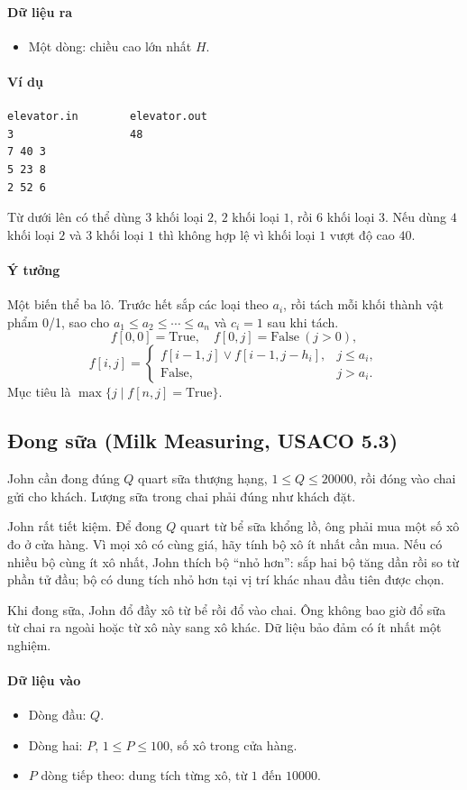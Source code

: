 \documentclass[11pt]{article}
\newcommand{\problem}[1]{\subsection{#1}}
\newcommand{\iosec}[1]{\paragraph{#1}}
\begin{document}
\iosec{Dữ liệu ra}
\begin{itemize}
  \item Một dòng: chiều cao lớn nhất \(H\).
\end{itemize}

\iosec{Ví dụ}
\begin{verbatim}
elevator.in        elevator.out
3                  48
7 40 3
5 23 8
2 52 6
\end{verbatim}

Từ dưới lên có thể dùng \(3\) khối loại \(2\), \(2\) khối loại \(1\), rồi \(6\) khối loại \(3\). Nếu dùng \(4\) khối loại \(2\) và \(3\) khối loại \(1\) thì không hợp lệ vì khối loại \(1\) vượt độ cao \(40\).

\iosec{Ý tưởng}
Một biến thể ba lô. Trước hết sắp các loại theo \(a_i\), rồi tách mỗi khối thành vật phẩm 0/1, sao cho \(a_1\le a_2\le\cdots\le a_n\) và \(c_i=1\) sau khi tách.
\[
  f[0,0]=\text{True},\quad f[0,j]=\text{False}\ (j>0),
\]
\[
  f[i,j]=
  \begin{cases}
    f[i-1,j]\lor f[i-1,j-h_i], & j\le a_i,\\
    \text{False}, & j>a_i.
  \end{cases}
\]
Mục tiêu là \(\max\{j\mid f[n,j]=\text{True}\}\).

\problem{Đong sữa (Milk Measuring, USACO 5.3)}

John cần đong đúng \(Q\) quart sữa thượng hạng, \(1 \le Q \le 20000\), rồi đóng vào chai gửi cho khách. Lượng sữa trong chai phải đúng như khách đặt.

John rất tiết kiệm. Để đong \(Q\) quart từ bể sữa khổng lồ, ông phải mua một số xô đo ở cửa hàng. Vì mọi xô có cùng giá, hãy tính bộ xô ít nhất cần mua. Nếu có nhiều bộ cùng ít xô nhất, John thích bộ ``nhỏ hơn'': sắp hai bộ tăng dần rồi so từ phần tử đầu; bộ có dung tích nhỏ hơn tại vị trí khác nhau đầu tiên được chọn.

Khi đong sữa, John đổ đầy xô từ bể rồi đổ vào chai. Ông không bao giờ đổ sữa từ chai ra ngoài hoặc từ xô này sang xô khác. Dữ liệu bảo đảm có ít nhất một nghiệm.

\iosec{Dữ liệu vào}
\begin{itemize}
  \item Dòng đầu: \(Q\).
  \item Dòng hai: \(P\), \(1 \le P \le 100\), số xô trong cửa hàng.
  \item \(P\) dòng tiếp theo: dung tích từng xô, từ \(1\) đến \(10000\).
\end{itemize}
\end{document}
